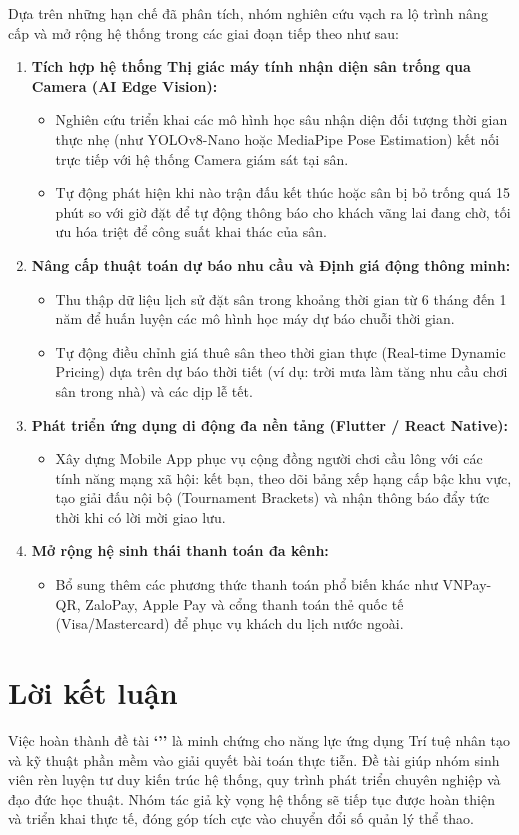 Dựa trên những hạn chế đã phân tích, nhóm nghiên cứu vạch ra lộ trình nâng cấp và mở rộng hệ thống trong các giai đoạn tiếp theo như sau:
\begin{enumerate}[label=\alph*)]
    \item \textbf{Tích hợp hệ thống Thị giác máy tính nhận diện sân trống qua Camera (AI Edge Vision):}
    \begin{itemize}
        \item Nghiên cứu triển khai các mô hình học sâu nhận diện đối tượng thời gian thực nhẹ (như YOLOv8-Nano hoặc MediaPipe Pose Estimation) kết nối trực tiếp với hệ thống Camera giám sát tại sân.
        \item Tự động phát hiện khi nào trận đấu kết thúc hoặc sân bị bỏ trống quá 15 phút so với giờ đặt để tự động thông báo cho khách vãng lai đang chờ, tối ưu hóa triệt để công suất khai thác của sân.
    \end{itemize}
    \item \textbf{Nâng cấp thuật toán dự báo nhu cầu và Định giá động thông minh:}
    \begin{itemize}
        \item Thu thập dữ liệu lịch sử đặt sân trong khoảng thời gian từ 6 tháng đến 1 năm để huấn luyện các mô hình học máy dự báo chuỗi thời gian.
        \item Tự động điều chỉnh giá thuê sân theo thời gian thực (Real-time Dynamic Pricing) dựa trên dự báo thời tiết (ví dụ: trời mưa làm tăng nhu cầu chơi sân trong nhà) và các dịp lễ tết.
    \end{itemize}
    \item \textbf{Phát triển ứng dụng di động đa nền tảng (Flutter / React Native):}
    \begin{itemize}
        \item Xây dựng Mobile App phục vụ cộng đồng người chơi cầu lông với các tính năng mạng xã hội: kết bạn, theo dõi bảng xếp hạng cấp bậc khu vực, tạo giải đấu nội bộ (Tournament Brackets) và nhận thông báo đẩy tức thời khi có lời mời giao lưu.
    \end{itemize}
    \item \textbf{Mở rộng hệ sinh thái thanh toán đa kênh:}
    \begin{itemize}
        \item Bổ sung thêm các phương thức thanh toán phổ biến khác như VNPay-QR, ZaloPay, Apple Pay và cổng thanh toán thẻ quốc tế (Visa/Mastercard) để phục vụ khách du lịch nước ngoài.
    \end{itemize}
\end{enumerate}

\section{Lời kết luận}
\label{sec:loiket}

Việc hoàn thành đề tài \textbf{`\reporttitle''} là minh chứng cho năng lực ứng dụng Trí tuệ nhân tạo và kỹ thuật phần mềm vào giải quyết bài toán thực tiễn. Đề tài giúp nhóm sinh viên rèn luyện tư duy kiến trúc hệ thống, quy trình phát triển chuyên nghiệp và đạo đức học thuật. Nhóm tác giả kỳ vọng hệ thống sẽ tiếp tục được hoàn thiện và triển khai thực tế, đóng góp tích cực vào chuyển đổi số quản lý thể thao.
